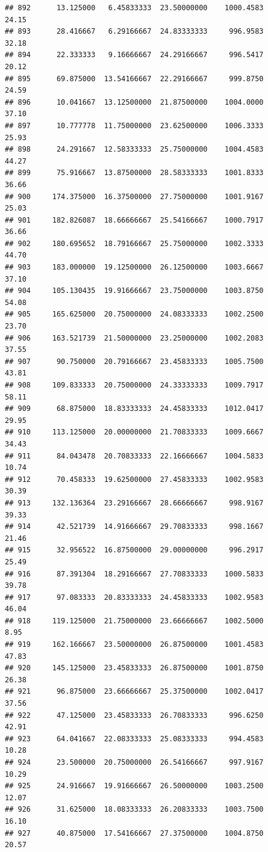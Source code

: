 \documentclass[
]{article}
\begin{document}
\begin{verbatim}
## 892      13.125000   6.45833333  23.50000000    1000.4583       24.15
## 893      28.416667   6.29166667  24.83333333     996.9583       32.18
## 894      22.333333   9.16666667  24.29166667     996.5417       20.12
## 895      69.875000  13.54166667  22.29166667     999.8750       24.59
## 896      10.041667  13.12500000  21.87500000    1004.0000       37.10
## 897      10.777778  11.75000000  23.62500000    1006.3333       25.93
## 898      24.291667  12.58333333  25.75000000    1004.4583       44.27
## 899      75.916667  13.87500000  28.58333333    1001.8333       36.66
## 900     174.375000  16.37500000  27.75000000    1001.9167       25.03
## 901     182.826087  18.66666667  25.54166667    1000.7917       36.66
## 902     180.695652  18.79166667  25.75000000    1002.3333       44.70
## 903     183.000000  19.12500000  26.12500000    1003.6667       37.10
## 904     105.130435  19.91666667  23.75000000    1003.8750       54.08
## 905     165.625000  20.75000000  24.08333333    1002.2500       23.70
## 906     163.521739  21.50000000  23.25000000    1002.2083       37.55
## 907      90.750000  20.79166667  23.45833333    1005.7500       43.81
## 908     109.833333  20.75000000  24.33333333    1009.7917       58.11
## 909      68.875000  18.83333333  24.45833333    1012.0417       29.95
## 910     113.125000  20.00000000  21.70833333    1009.6667       34.43
## 911      84.043478  20.70833333  22.16666667    1004.5833       10.74
## 912      70.458333  19.62500000  27.45833333    1002.9583       30.39
## 913     132.136364  23.29166667  28.66666667     998.9167       39.33
## 914      42.521739  14.91666667  29.70833333     998.1667       21.46
## 915      32.956522  16.87500000  29.00000000     996.2917       25.49
## 916      87.391304  18.29166667  27.70833333    1000.5833       39.78
## 917      97.083333  20.83333333  24.45833333    1002.9583       46.04
## 918     119.125000  21.75000000  23.66666667    1002.5000        8.95
## 919     162.166667  23.50000000  26.87500000    1001.4583       47.83
## 920     145.125000  23.45833333  26.87500000    1001.8750       26.38
## 921      96.875000  23.66666667  25.37500000    1002.0417       37.56
## 922      47.125000  23.45833333  26.70833333     996.6250       42.91
## 923      64.041667  22.08333333  25.08333333     994.4583       10.28
## 924      23.500000  20.75000000  26.54166667     997.9167       10.29
## 925      24.916667  19.91666667  26.50000000    1003.2500       12.07
## 926      31.625000  18.08333333  26.20833333    1003.7500       16.10
## 927      40.875000  17.54166667  27.37500000    1004.8750       20.57

\end{verbatim}
\end{document}
